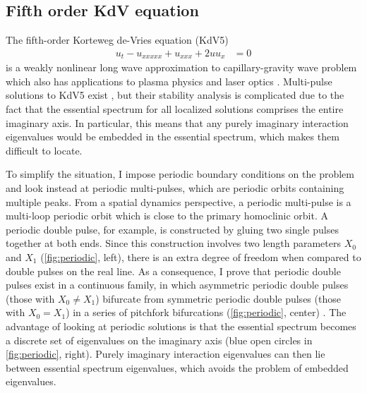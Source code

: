 \documentclass[12pt,reqno,oneside,hidelinks]{article}
\begin{document}
\subsection*{Fifth order KdV equation}

The fifth-order Korteweg de-Vries equation (KdV5)
\begin{align*}
    u_t - u_{xxxxx} + u_{xxx} + 2 u u_x &= 0
\end{align*} 
is a weakly nonlinear long wave approximation to capillary-gravity wave problem which also has applications to plasma physics and laser optics \cite{Pelinovsky2007}. Multi-pulse solutions to KdV5 exist \cite{SandstedeStrut}, but their stability analysis is complicated due to the fact that the essential spectrum for all localized solutions comprises the entire imaginary axis. In particular, this means that any purely imaginary interaction eigenvalues would be embedded in the essential spectrum, which makes them difficult to locate.

To simplify the situation, I impose periodic boundary conditions on the problem and look instead at periodic multi-pulses, which are periodic orbits containing multiple peaks. From a spatial dynamics perspective, a periodic multi-pulse is a multi-loop periodic orbit which is close to the primary homoclinic orbit. A periodic double pulse, for example, is constructed by gluing two single pulses together at both ends. Since this construction involves two length parameters $X_0$ and $X_1$ (\cref{fig:periodic}, left), there is an extra degree of freedom when compared to double pulses on the real line. As a consequence, I prove that periodic double pulses exist in a continuous family, in which asymmetric periodic double pulses (those with $X_0 \neq X_1$) bifurcate from symmetric periodic double pulses (those with $X_0 = X_1$) in a series of pitchfork bifurcations (\cref{fig:periodic}, center) \cite{ParkerKdV}. The advantage of looking at periodic solutions is that the essential spectrum becomes a discrete set of eigenvalues on the imaginary axis (blue open circles in \cref{fig:periodic}, right). Purely imaginary interaction eigenvalues can then lie between essential spectrum eigenvalues, which avoids the problem of embedded eigenvalues. 
\end{document}
